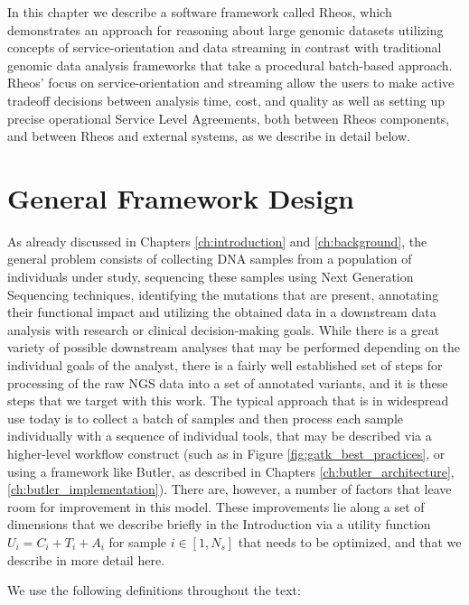 In this chapter we describe a software framework called Rheos, which demonstrates an approach for reasoning about large genomic datasets utilizing concepts of service-orientation and data streaming in contrast with traditional genomic data analysis frameworks\autocite{depristo2011framework} that take a procedural batch-based approach. Rheos' focus on service-orientation and streaming allow the users to make active tradeoff decisions between analysis time, cost, and quality as well as setting up precise operational Service Level Agreements, both between Rheos components, and between Rheos and external systems, as we describe in detail below.

\section{General Framework Design}

As already discussed in Chapters \ref{ch:introduction} and \ref{ch:background}, the general problem consists of collecting DNA samples from a population of individuals under study, sequencing these samples using Next Generation Sequencing techniques, identifying the mutations that are present, annotating their functional impact and utilizing the obtained data in a downstream data analysis with research or clinical decision-making goals. While there is a great variety of possible downstream analyses that may be performed depending on the individual goals of the analyst, there is a fairly well established set of steps for processing of the raw NGS data into a set of annotated variants, and it is these steps that we target with this work. The typical approach that is in widespread use today is to collect a batch of samples and then process each sample individually with a sequence of individual tools, that may be described via a higher-level workflow construct (such as in Figure \ref{fig:gatk_best_practices}, or using a framework like Butler, as described in Chapters \ref{ch:butler_architecture}, \ref{ch:butler_implementation}). There are, however, a number of factors that leave room for improvement in this model. These improvements lie along a set of dimensions that we describe briefly in the Introduction via a utility function $U_i = C_i + T_i + A_i$ for sample $i \in [1,N_s]$  that needs to be optimized, and that we describe in more detail here.

We use the following definitions throughout the text:

